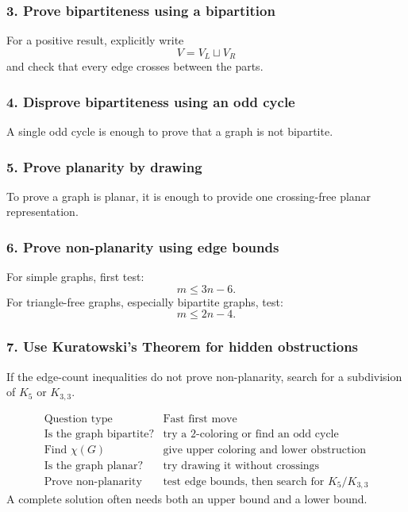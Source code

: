 \subsubsection*{3. Prove bipartiteness using a bipartition}
For a positive result, explicitly write
\[
V=V_L\sqcup V_R
\]
and check that every edge crosses between the parts.

\subsubsection*{4. Disprove bipartiteness using an odd cycle}
A single odd cycle is enough to prove that a graph is not bipartite.

\subsubsection*{5. Prove planarity by drawing}
To prove a graph is planar, it is enough to provide one crossing-free planar representation.

\subsubsection*{6. Prove non-planarity using edge bounds}
For simple graphs, first test:
\[
m\le 3n-6.
\]
For triangle-free graphs, especially bipartite graphs, test:
\[
m\le 2n-4.
\]

\subsubsection*{7. Use Kuratowski's Theorem for hidden obstructions}
If the edge-count inequalities do not prove non-planarity, search for a subdivision of \(K_5\) or \(K_{3,3}\).

\begin{extension}[title={Fast decision tree for Handout 09}]
\[
\begin{array}{c|c}
\text{Question type} & \text{Fast first move} \\ \hline
\text{Is the graph bipartite?} & \text{try a 2-coloring or find an odd cycle} \\
\text{Find }\chi(G) & \text{give upper coloring and lower obstruction} \\
\text{Is the graph planar?} & \text{try drawing it without crossings} \\
\text{Prove non-planarity} & \text{test edge bounds, then search for }K_5/K_{3,3}
\end{array}
\]
A complete solution often needs both an upper bound and a lower bound.
\end{extension}

